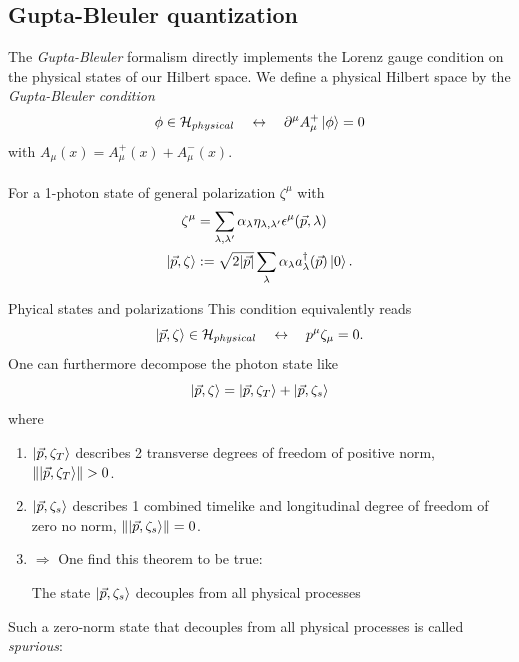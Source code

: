 \subsection{Gupta-Bleuler quantization}
The \emph{Gupta-Bleuler} formalism directly implements the Lorenz gauge condition on the physical states of our Hilbert space. We define a physical Hilbert space by the \emph{Gupta-Bleuler condition}
\begin{equation}
	\phi \in \mathcal{H}_{physical} \quad \leftrightarrow \quad \partial^{\mu} A^+_{\mu} \ket{\phi} = 0
\end{equation}
with $A_{\mu}(x) = A^+_{\mu}(x) +A^-_{\mu}(x)$.\\
\\
For a 1-photon state of general polarization $\zeta^{\mu}$ with
\begin{align}
	\zeta^{\mu} &= \sum_{\lambda,\lambda'} \alpha_{\lambda} \eta_{\lambda, \lambda'} \epsilon^{\mu}(\vec{p},\lambda) \\
	\ket{\vec{p},\zeta} &:= \sqrt{2 |\vec{p}|} \sum_{\lambda} \alpha_{\lambda} a^{\dagger}_{\lambda} (\vec{p}) \ket{0}.
\end{align}
\begin{mybox}{Phyical states and polarizations}
This condition equivalently reads
\begin{equation}
	\ket{\vec{p},\zeta} \in \mathcal{H}_{physical} \quad \leftrightarrow\quad p^{\mu} \zeta_{\mu} = 0.
\end{equation}
One can furthermore decompose the photon state like
\begin{equation}
	\ket{\vec{p},\zeta} = \ket{\vec{p},\zeta_T} + \ket{\vec{p},\zeta_s}
\end{equation}
where 
\begin{enumerate}
	\item $\ket{\vec{p},\zeta_T}$ describes 2 transverse degrees of freedom of positive norm, $\norm{\ket{\vec{p},\zeta_T}} >0$.
	\item $\ket{\vec{p},\zeta_s}$ describes 1 combined timelike and longitudinal degree of freedom of zero no norm, $\norm{\ket{\vec{p},\zeta_s}} =0$.
	\item $\Rightarrow$ One find this theorem to be true:
	\begin{statements}
		The state $\ket{\vec{p},\zeta_s}$ decouples from all physical processes
	\end{statements}
\end{enumerate}
\end{mybox}
Such a zero-norm state that decouples from all physical processes is called \emph{spurious}:
